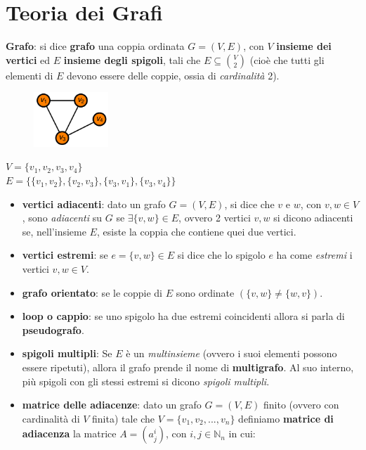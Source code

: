 \chapter{Teoria dei Grafi}
\begin{flushleft}
    \textbf{Grafo}: si dice \textbf{grafo} una coppia ordinata $G=(V,E)$, con $V$ \textbf{insieme dei vertici} ed $E$ \textbf{insieme degli spigoli}, tali che $E \subseteq \binom{V}{2}$ (cioè che tutti gli elementi di $E$ devono essere delle coppie, ossia di \textit{cardinalità} 2).
    
    \begin{figure}[h]
        \centering
        \includegraphics[width=0.25\textwidth]{img/grafi_1}
    \end{figure}

    {\centering
        $V = \{v_1, v_2, v_3, v_4\}$ \\
        $E = \{\{v_1, v_2\}, \{v_2, v_3\}, \{v_3, v_1\}, \{v_3, v_4\}\}$
    \par}
    \begin{itemize}[nosep]
        \item \textbf{vertici adiacenti}: dato un grafo $G=(V, E)$, si dice che $v$ e $w$, con $v, w \in V$, sono \textit{adiacenti} su $G$ se $\exists\{v,w\} \in E$, ovvero 2 vertici $v,w$ si dicono adiacenti se, nell'insieme $E$, esiste la coppia che contiene quei due vertici.
        \item \textbf{vertici estremi}: se $e=\{v, w\} \in E$ si dice che lo spigolo $e$ ha come \textit{estremi} i vertici $v, w \in V$.
        \item \textbf{grafo orientato}: se le coppie di $E$ sono ordinate $(\{v, w\} \neq \{w, v\})$.
        \item \textbf{loop o cappio}: se uno spigolo ha due estremi coincidenti allora si parla di \textbf{pseudografo}.
        \item \textbf{spigoli multipli}: Se $E$ è un \textit{multinsieme} (ovvero i suoi elementi possono essere ripetuti), allora il grafo prende il nome di \textbf{multigrafo}. Al suo interno, più spigoli con gli stessi estremi si dicono \textit{spigoli multipli}.
        \newpage
        \item \textbf{matrice delle adiacenze}: dato un grafo $G=(V, E)$ finito (ovvero con cardinalità di $V$ finita) tale che $V = \{v_1, v_2, ..., v_n\}$ definiamo \textbf{matrice di adiacenza} la matrice $A = (a_j^i)$, con $i,j \in \mathbb{N}_n$ in cui:


\end{itemize}
\end{flushleft}
